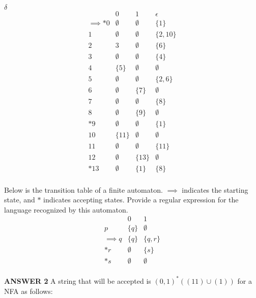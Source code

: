 \documentclass[addpoints]{exam}
\begin{document}
\begin{questions}
\begin{center}
    $\delta$
    \[
  \begin{array}{r|ccc}
    & 0 & 1 & \epsilon\\\hline
    \implies *0 &  \emptyset & \emptyset & \{1\} \\
     1 & \emptyset & \emptyset & \{2,10\}\\
    2 & 3 & \emptyset & \{6\}  \\
    3 & \emptyset & \emptyset & \{4\} \\
    4 & \{5\} & \emptyset & \emptyset  \\
    5 & \emptyset & \emptyset & \{2,6\} \\
    6 & \emptyset & \{7\} & \emptyset  \\
    7 & \emptyset & \emptyset & \{8\} \\
    8 & \emptyset & \{9\} & \emptyset  \\
    *9 & \emptyset & \emptyset & \{1\} \\
    10 & \{11\} & \emptyset & \emptyset  \\
    11 & \emptyset & \emptyset & \{11\} \\
    12 & \emptyset & \{13\} & \emptyset  \\
    *13 & \emptyset & \{1\} & \{8\} \\
    
  \end{array}
  \]
\end{center}

  
\question[5] Below is the transition table of a finite automaton. $\implies$ indicates the starting state, and $*$ indicates accepting states. Provide a regular expression for the language recognized by this automaton.
  \[
  \begin{array}{r|cc}
    & 0 & 1 \\\hline
    p & \{ q \} & \emptyset \\
    \implies q & \{ q \} & \{ q, r \} \\
    *r & \emptyset & \{ s \} \\
    *s & \emptyset & \emptyset \\
  \end{array}
  \]

  \begin{center}
      \textbf{ANSWER 2}
      A string that will be accepted is $(0,1)^*((11)\cup (1))$ for a NFA as follows:
  \end{center}


\end{questions}
\end{document}
